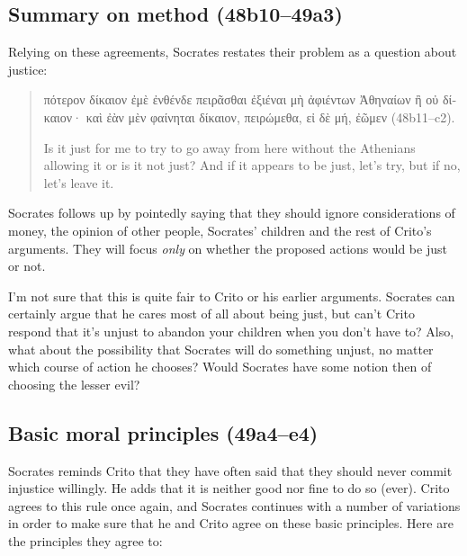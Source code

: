 \documentclass[12pt,letterpaper]{article}
\begin{document}

\subsection*{Summary on method (48b10--49a3)}

Relying on these agreements, Socrates restates their problem as a question
about justice:

\begin{quote}

    \textgreek{πότερον δίκαιον ἐμὲ ἐνθένδε πειρᾶσθαι ἐξιέναι μὴ ἀφιέντων Ἀθηναίων ἢ οὐ δίκαιον· καὶ ἐὰν μὲν φαίνηται δίκαιον, πειρώμεθα, εἰ δὲ μή, ἐῶμεν} (48b11--c2).

    Is it just for me to try to go away from here without the Athenians allowing it or is it not just? And if it appears to be just, let's try, but if no, let's leave it.

\end{quote}

Socrates follows up by pointedly saying that they should ignore considerations of money, the opinion of other people, Socrates' children and the rest of Crito's arguments. They will focus \emph{only} on whether the proposed actions would be just or not.

I'm not sure that this is quite fair to Crito or his earlier arguments. Socrates can certainly argue that he cares most of all about being just, but can't Crito respond that it's unjust to abandon your children when you don't have to? Also, what about the possibility that Socrates will do something unjust, no matter which course of action he chooses? Would Socrates have some notion then of choosing the lesser evil?


\subsection*{Basic moral principles (49a4--e4)}

Socrates reminds Crito that they have often said that they should never commit injustice willingly. He adds that it is neither good nor fine to do so (ever). Crito agrees to this rule once again, and Socrates continues with a number of variations in order to make sure that he and Crito agree on these basic principles. Here are the principles they agree to:
\end{document}
